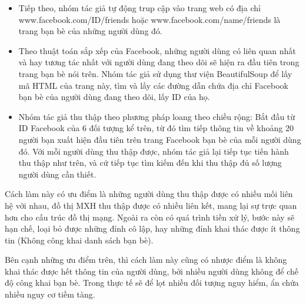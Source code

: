 \begin {itemize}
\begin {enumerate} [+]
\item https://www.facebook.com/jbnguyenhuuvinh: Anh Ba Sàm, tên thật là Nguyễn Hữu Vinh là một blogger, từng là công an và đảng viên Đảng Cộng sản Việt Nam, từng công tác ở Ủy ban Việt kiều Trung ương. Ông bị Chính phủ CHXHCN Việt Nam bắt giữ và bị cáo buộc và phạt tù 5 năm do có hành vi đăng tải các bài viết trên mạng Internet vi phạm Điều 258 Bộ Luật Hình sự năm 2015 sửa đổi bổ sung năm 2017 về Tội lợi dụng các quyền tự do dân chủ xâm phạm lợi ích của Nhà nước, quyền, lợi ích hợp pháp của tổ chức, công dân.

\item https://www.facebook.com/profile.php?id=100015485029386: Nguyễn Trọng đang sinh sống tại California, Hoa Kỳ. Lợi dụng quyền tự do dân chủ, thường xuyên có những bài viết xuyên tạc, chống phá đường lối chính sác của Đảng, pháp luật của Nhà nước.
\end {enumerate}
\item Tiếp theo, nhóm tác giả tự động trup cập vào trang web có địa chỉ www.facebook.com/{ID}/friends hoặc www.facebook.com/{name}/friends là trang bạn bè của những người dùng đó.

\item Theo thuật toán sắp xếp của Facebook, những người dùng có liên quan nhất và hay tương tác nhất với người dùng đang theo dõi sẽ hiện ra đầu tiên trong trang bạn bè nói trên. Nhóm tác giả sử dụng thư viện BeautifulSoup để lấy mã HTML của trang này, tìm và lấy các đường dẫn chứa địa chỉ Facebook bạn bè của người dùng đang theo dõi, lấy ID của họ.

\item Nhóm tác giả thu thập theo phương pháp loang theo chiều rộng: Bắt đầu từ ID Facebook của 6 đối tượng kể trên, từ đó tìm tiếp thông tin về khoảng 20 người bạn xuất hiện đầu tiên trên trang Facebook bạn bè của mỗi người dùng đó. Với mỗi người dùng thu thập được, nhóm tác giả lại tiếp tục tiến hành thu thập như trên, và cứ tiếp tục tìm kiếm đến khi thu thập đủ số lượng người dùng cần thiết.
\end {itemize}		
Cách làm này có ưu điểm là những người dùng thu thập được có nhiều mối liên hệ với nhau, đồ thị MXH thu thập được có nhiều liên kết, mang lại sự trực quan hơn cho cấu trúc đồ thị mạng. Ngoài ra còn có quá trình tiền xử lý, bước này sẽ hạn chế, loại bỏ được những đỉnh cô lập, hay những đỉnh khai thác được ít thông tin (Không công khai danh sách bạn bè).

Bên cạnh những ưu điểm trên, thì cách làm này cũng có nhược điểm là không khai thác được hết thông tin của người dùng, bởi nhiều người dùng không để chế độ công khai bạn bè. Trong thực tế sẽ để lọt nhiều đối tượng nguy hiểm, ẩn chứa nhiều nguy cơ tiềm tàng.

